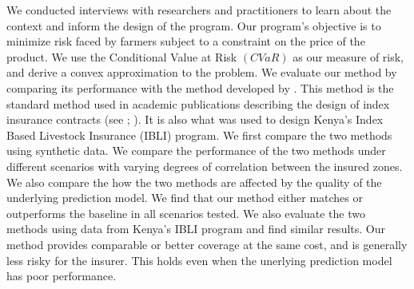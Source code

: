\documentclass[11pt]{article}
\begin{document}
We conducted interviews with researchers and practitioners to learn about the context and inform the design of the program. Our program's objective is to minimize risk faced by farmers subject to a constraint on the price of the product. We use the Conditional Value at Risk $(CVaR)$ as our measure of risk, and derive a convex approximation to the problem. We evaluate our method by comparing its performance with the method developed by \cite{chantarat2013designing}. This method is the standard method used in academic publications describing the design of index insurance contracts (see \cite{flatnes2018improving}; \cite{jensen2019does}). It is also what was used to design Kenya's Index Based Livestock Insurance (IBLI) program. We first compare the two methods using synthetic data. We compare the performance of the two methods under different scenarios with varying degrees of correlation between the insured zones. We also compare the how the two methods are affected by the quality of the underlying prediction model. We find that our method either matches or outperforms the baseline in all scenarios tested. We also evaluate the two methods using data from Kenya's IBLI program and find similar results. Our method provides comparable or better coverage at the same cost, and is generally less risky for the insurer. This holds even when the unerlying prediction model has poor performance. 

\end{document}
